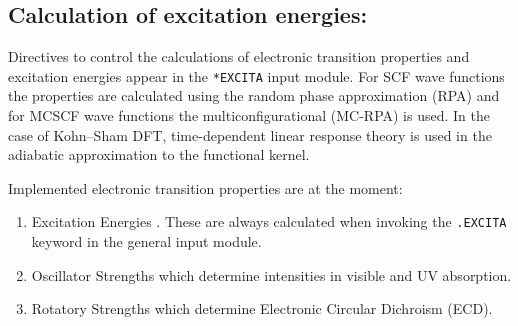 \subsection{Calculation of excitation energies: }
\label{sec:excita}

Directives to control the calculations of electronic
transition
properties and excitation energies appear in
the \verb|*EXCITA| input module.
For SCF wave
functions the properties are calculated using the
random phase approximation (RPA) and for MCSCF
wave functions the multiconfigurational (MC-RPA) is used.
In the case of Kohn--Sham DFT, time-dependent linear response theory
is used in the adiabatic approximation to the functional kernel.

Implemented electronic transition properties are at the moment:

\begin{enumerate}
\item Excitation Energies
.
These are always calculated when
invoking the \verb|.EXCITA| keyword in the general input module.
\item Oscillator Strengths which determine
intensities in visible and UV absorption.
\item Rotatory Strengths which determine
Electronic Circular Dichroism
(ECD).
\end{enumerate}


